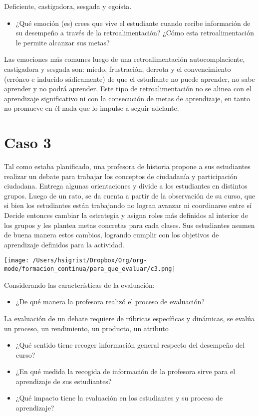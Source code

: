 \documentclass[12pt,letterpaper,article,x11names]{memoir}
\begin{document}
Deficiente, castigadora, sesgada y egoísta.
\begin{itemize}
\item ¿Qué emoción (es) crees que vive el estudiante cuando recibe información de su desempeño a través de la retroalimentación? ¿Cómo esta retroalimentación le permite alcanzar sus metas?
\end{itemize}
Las emociones más comunes luego de una retroalimentación autocomplaciente, castigadora y sesgada son: miedo, frustración, derrota y el convencimiento (erróneo e inducido sádicamente) de que el estudiante no puede aprender, no sabe aprender y no podrá aprender. Este tipo de retroalimentación no se alinea con el aprendizaje significativo ni con la consecución de metas de aprendizaje, en tanto no promueve en él nada que lo impulse a seguir adelante. 
\section{Caso 3}
\label{sec:orgf891546}
Tal como estaba planificado, una profesora de historia propone a sus estudiantes realizar un debate para trabajar los conceptos de ciudadanía y participación ciudadana. Entrega algunas orientaciones y divide a los estudiantes en distintos grupos. Luego de un rato, se da cuenta a partir de la observación de su curso, que si bien los estudiantes están trabajando no logran avanzar ni coordinarse entre sí Decide entonces cambiar la estrategia y asigna roles más definidos al interior de los grupos y les plantea metas concretas para cada clases. Sus estudiantes asumen de buena manera estos cambios, logrando cumplir con los objetivos de aprendizaje definidos para la actividad.

\begin{center}
\texttt{[image: /Users/hsigrist/Dropbox/Org/org-mode/formacion\_continua/para\_que\_evaluar/c3.png]}
\end{center}

Considerando las características de la evaluación:
\begin{itemize}
\item ¿De qué manera la profesora realizó el proceso de evaluación?
\end{itemize}
La evaluación de un debate requiere de rúbricas específicas y dinámicas, se evalúa un proceso, un rendimiento, un producto, un atributo 
\begin{itemize}
\item ¿Qué sentido tiene recoger información general respecto del desempeño del curso?
\item ¿En qué medida la recogida de información de la profesora sirve para el aprendizaje de sus estudiantes?
\item ¿Qué impacto tiene la evaluación en los estudiantes y su proceso de aprendizaje?
\end{itemize}
\end{document}
